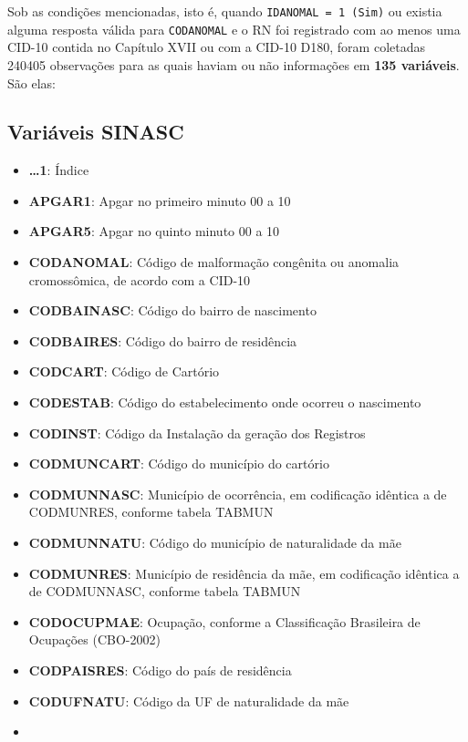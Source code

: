 \documentclass[
]{article}
\providecommand{\tightlist}{%
  \setlength{\itemsep}{0pt}\setlength{\parskip}{0pt}}
\begin{document}
Sob as condições mencionadas, isto é, quando
\texttt{IDANOMAL\ =\ 1\ (Sim)} ou existia alguma resposta válida para
\texttt{CODANOMAL} e o RN foi registrado com ao menos uma CID-10 contida
no Capítulo XVII ou com a CID-10 D180, foram coletadas 240405
observações para as quais haviam ou não informações em \textbf{135
variáveis}. São elas:

\hypertarget{variuxe1veis-sinasc}{%
\subsection{Variáveis SINASC}\label{variuxe1veis-sinasc}}

\begin{itemize}
\tightlist
\item
  \textbf{\ldots1}: Índice
\item
  \textbf{APGAR1}: Apgar no primeiro minuto 00 a 10
\item
  \textbf{APGAR5}: Apgar no quinto minuto 00 a 10
\item
  \textbf{CODANOMAL}: Código de malformação congênita ou anomalia
  cromossômica, de acordo com a CID-10
\item
  \textbf{CODBAINASC}: Código do bairro de nascimento
\item
  \textbf{CODBAIRES}: Código do bairro de residência
\item
  \textbf{CODCART}: Código de Cartório
\item
  \textbf{CODESTAB}: Código do estabelecimento onde ocorreu o nascimento
\item
  \textbf{CODINST}: Código da Instalação da geração dos Registros
\item
  \textbf{CODMUNCART}: Código do município do cartório
\item
  \textbf{CODMUNNASC}: Município de ocorrência, em codificação idêntica
  a de CODMUNRES, conforme tabela TABMUN
\item
  \textbf{CODMUNNATU}: Código do município de naturalidade da mãe
\item
  \textbf{CODMUNRES}: Município de residência da mãe, em codificação
  idêntica a de CODMUNNASC, conforme tabela TABMUN
\item
  \textbf{CODOCUPMAE}: Ocupação, conforme a Classificação Brasileira de
  Ocupações (CBO-2002)
\item
  \textbf{CODPAISRES}: Código do país de residência
\item
  \textbf{CODUFNATU}: Código da UF de naturalidade da mãe
\item

\end{itemize}
\end{document}
